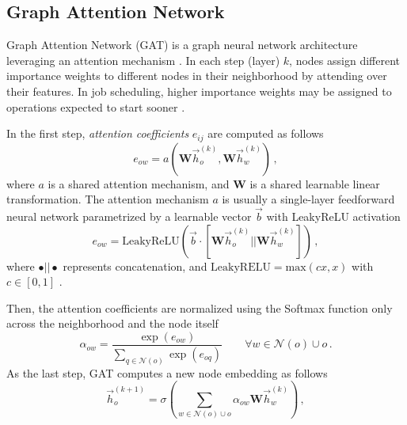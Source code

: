 \subsection{Graph Attention Network} \label{Graph Attention Network}
Graph Attention Network (GAT) is a graph neural network architecture leveraging an attention mechanism \cite{veličković2018graph}. In each step (layer) $k$, nodes assign different importance weights to different nodes in their neighborhood by attending over their features. In job scheduling, higher importance weights may be assigned to operations expected to start sooner \cite{9826438}.
\par
In the first step, \textit{attention coefficients} $e_{ij}$ are computed as follows \cite{9826438, veličković2018graph}
\begin{equation} \label{equation:2.6}
	e_{ow} = a\left ( \boldsymbol{W} \vec{h}_o^{(k)}, \boldsymbol{W} \vec{h}_w^{(k)}  \right ) \, ,
\end{equation}  
where $a$ is a shared attention mechanism, and $\boldsymbol{W}$ is a shared learnable linear transformation. The attention mechanism $a$ is usually a single-layer feedforward neural network parametrized by a learnable vector $\vec{b}$ with LeakyReLU activation \cite{9826438, veličković2018graph, DBLP:journals/corr/abs-2105-14491}
\begin{equation} \label{equation:2.7}
	e_{ow} = \text{LeakyReLU}\left ( \vec{b} \cdot \left [ \boldsymbol{W}\vec{h}_o^{(k)} || \boldsymbol{W}\vec{h}_w^{(k)} \right ] \right ) \, ,
\end{equation}
where $\bullet||\bullet$ represents concatenation, and $\text{LeakyRELU} = \text{max}(cx,x)$ with $c \in [0,1]$ \cite{leaky_relu}.
\par
Then, the attention coefficients are normalized using the Softmax function only across the neighborhood and the node itself \cite{9826438, veličković2018graph}
\begin{equation}
	\alpha_{ow} = \frac{\exp(e_{ow})}{\sum_{q \in \mathcal{N}(o)} \exp(e_{oq})} \hspace{2em} \forall w \in \mathcal{N}(o) \cup {o} \, .
\end{equation}
As the last step, GAT computes a new node embedding as follows \cite{9826438, veličković2018graph}
\begin{equation} \label{equation:2.9}
	\vec{h}_o^{(k+1)} = \sigma \left ( \sum_{w \in \mathcal{N}(o) \cup {o}} \alpha_{ow} \boldsymbol{W} \vec{h}_w^{(k)} \right ) \, ,
\end{equation}
